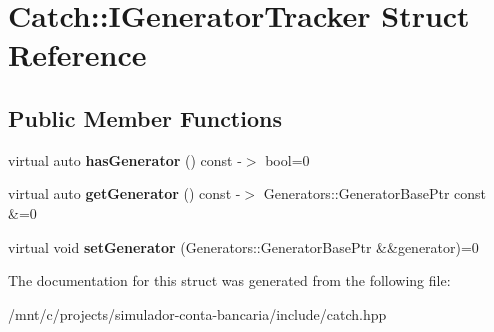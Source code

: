 \hypertarget{structCatch_1_1IGeneratorTracker}{}\section{Catch\+:\+:I\+Generator\+Tracker Struct Reference}
\label{structCatch_1_1IGeneratorTracker}
\subsection*{Public Member Functions}
\begin{DoxyCompactItemize}
\item 
\mbox{\label{structCatch_1_1IGeneratorTracker_ae88084f9af27c8b9a5d5775b9c148498}} 
virtual auto {\bfseries has\+Generator} () const -\/$>$ bool=0
\item 
\mbox{\label{structCatch_1_1IGeneratorTracker_a23be942fc51672598bfa02c678c3078a}} 
virtual auto {\bfseries get\+Generator} () const -\/$>$ Generators\+::\+Generator\+Base\+Ptr const \&=0
\item 
\mbox{\label{structCatch_1_1IGeneratorTracker_a9945eff42219edc5a7071eebd8b0419e}} 
virtual void {\bfseries set\+Generator} (Generators\+::\+Generator\+Base\+Ptr \&\&generator)=0
\end{DoxyCompactItemize}


The documentation for this struct was generated from the following file\+:\begin{DoxyCompactItemize}
\item 
/mnt/c/projects/simulador-\/conta-\/bancaria/include/catch.\+hpp\end{DoxyCompactItemize}
